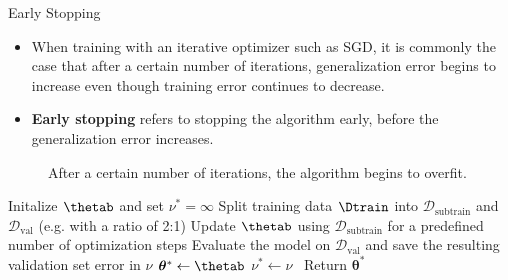 \begin{vbframe}{Early Stopping}
  \begin{itemize}
    \item When training with an iterative optimizer such as SGD, it is commonly the case that after a certain number of iterations, generalization error begins to increase even though training error continues to decrease.     
    \item \textbf{Early stopping} refers to stopping the algorithm early, before the generalization error increases.
  \end{itemize}
  \begin{figure}
    \centering
      \caption{After a certain number of iterations, the algorithm begins to overfit.}
  \end{figure}
\framebreak
   \begin{algorithm}[H]
  \footnotesize
  \caption{Early Stopping}
    \begin{algorithmic}[1]
      \State Initalize $\thetab$ and set $\nu^* = \infty$
      \State Split training data $\Dtrain$ into $\mathcal{D}_{\text{subtrain}}$ and $\mathcal{D}_{\text{val}}$ (e.g. with a ratio of 2:1)
        \State Update $\thetab$ using $\mathcal{D}_{\text{subtrain}}$ for a predefined number of optimization steps
        \State Evaluate the model on $\mathcal{D}_{\text{val}}$ and save the resulting validation set error in $\nu$
        \If{$\nu < \nu^*$: }
          \State $ \boldsymbol{\theta}^* \leftarrow \thetab$
          \State $\nu^* \leftarrow \nu$
        \EndIf
      \EndWhile
      \State \,  Return $\boldsymbol{\theta}^*$ 
    \end{algorithmic}
  \end{algorithm}

\end{vbframe}
